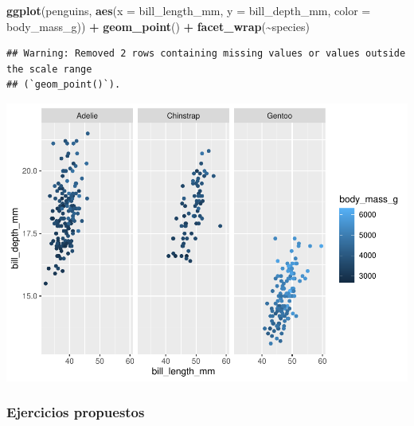 \documentclass[
]{book}
\newenvironment{Shaded}{\begin{snugshade}}{\end{snugshade}}
\newcommand{\AttributeTok}[1]{\textcolor[rgb]{0.13,0.29,0.53}{#1}}
\newcommand{\FunctionTok}[1]{\textcolor[rgb]{0.13,0.29,0.53}{\textbf{#1}}}
\newcommand{\NormalTok}[1]{#1}
\newcommand{\SpecialCharTok}[1]{\textcolor[rgb]{0.81,0.36,0.00}{\textbf{#1}}}
\begin{document}
\begin{Shaded}
\begin{Highlighting}[]
\FunctionTok{ggplot}\NormalTok{(penguins, }\FunctionTok{aes}\NormalTok{(}\AttributeTok{x =}\NormalTok{ bill\_length\_mm, }\AttributeTok{y =}\NormalTok{ bill\_depth\_mm, }\AttributeTok{color =}\NormalTok{ body\_mass\_g)) }\SpecialCharTok{+}
  \FunctionTok{geom\_point}\NormalTok{() }\SpecialCharTok{+}
  \FunctionTok{facet\_wrap}\NormalTok{(}\SpecialCharTok{\textasciitilde{}}\NormalTok{species)}
\end{Highlighting}
\end{Shaded}

\begin{verbatim}
## Warning: Removed 2 rows containing missing values or values outside the scale range
## (`geom_point()`).
\end{verbatim}

\includegraphics{bookdown-demo_files/figure-latex/unnamed-chunk-197-1.pdf}

\subsubsection{Ejercicios propuestos}\label{ejercicios-propuestos}
\end{document}
